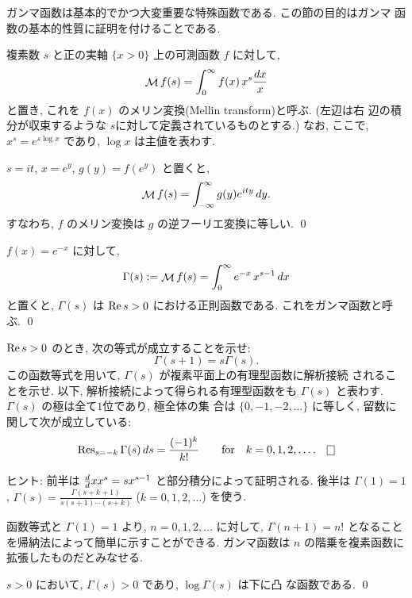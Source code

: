 \documentclass[12pt,twoside]{jarticle}
\begin{document}
ガンマ函数は基本的でかつ大変重要な特殊函数である. この節の目的はガンマ
函数の基本的性質に証明を付けることである. 

複素数 $s$ と正の実軸 $\{x > 0\}$ 上の可測函数 $f$ に対して,
\[
  \mathop{\mathcal{M}}\nolimits f(s) = \int_0^\infty f(x) \, x^s \frac{dx}{x}
\]%
と置き, これを $f(x)$ のメリン変換(Mellin transform)と呼ぶ. (左辺は右
辺の積分が収束するような $s$に対して定義されているものとする.) なお, 
ここで, $x^s = e^{s\log x}$ であり, $\log x$ は主値を表わす.

\begin{question}[メリン変換とフーリエ変換の関係]
  $s=it$, $x=e^y$, $g(y)=f(e^y)$ と置くと,
  \[
    \mathop{\mathcal{M}}\nolimits f(s) = \int_{-\infty}^\infty g(y) e^{ity}\, dy.
  \]
  すなわち, $f$ のメリン変換は $g$ の逆フーリエ変換に等しい.
  \qed
\end{question}

\begin{question}[ガンマ函数の定義]
  $f(x) = e^{-x}$ に対して, 
  \[
    \Gamma(s)
    := \mathop{\mathcal{M}}\nolimits f(s) = \int_0^\infty e^{-x}\,x^{s-1}\,dx
  \]%
  と置くと, $\Gamma(s)$ は $\mathop{\mathrm{Re}}\nolimits s > 0$ における正則函数である.
  これをガンマ函数と呼ぶ.
  \qed
\end{question}

\begin{question}[函数等式と解析接続]
\label{q:Gamma-func-id}
  $\mathop{\mathrm{Re}}\nolimits s > 0$ のとき, 次の等式が成立することを示せ:
  \[
    \Gamma(s+1) = s \Gamma(s).
  \]%
  この函数等式を用いて, $\Gamma(s)$ が複素平面上の有理型函数に解析接続
  されることを示せ. 以下, 解析接続によって得られる有理型函数をも 
  $\Gamma(s)$ と表わす. $\Gamma(s)$ の極は全て$1$位であり, 極全体の集
  合は $\{0,-1,-2,\dots\}$ に等しく, 留数に関して次が成立している:
  \[
    \Res_{s=-k} \Gamma(s)\,ds = \frac{(-1)^k}{k!}
    \qquad\mbox{for}\quad
    k = 0,1,2,\dots.
  \qed
  \]%
\end{question}

\noindent ヒント: 
前半は $\frac{d}{d }{x}x^s = s x^{s-1}$ と部分積分によって証明される. 
後半は $\Gamma(1)=1$, $\Gamma(s) = \frac{\Gamma(s+k+1)}{s(s+1)\cdots(s+k)}$
($k=0,1,2,\dots$) を使う.

\noindent 函数等式と $\Gamma(1)=1$ より, $n=0,1,2,\dots$ に対して,
$\Gamma(n+1) = n!$ となることを帰納法によって簡単に示すことができる. 
ガンマ函数は $n$ の階乗を複素函数に拡張したものだとみなせる.

\begin{question}[対数凸性]
  $s > 0$ において, $\Gamma(s) > 0$ であり, $\log \Gamma(s)$ は下に凸
  な函数である.
  \qed
\end{question}
\end{document}
